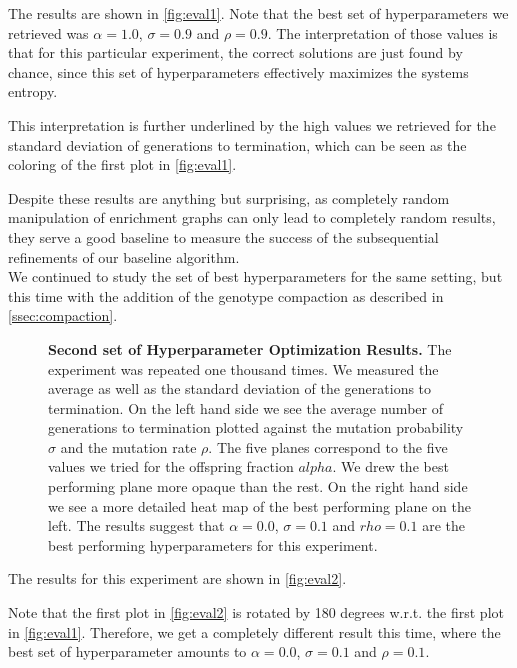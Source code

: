 The results are shown in \autoref{fig:eval1}.
Note that the best set of hyperparameters we retrieved was $\alpha=1.0$, $\sigma=0.9$ and $\rho=0.9$.
The interpretation of those values is that for this particular experiment, the correct solutions are just found by chance, since this set of hyperparameters effectively maximizes the systems entropy.

This interpretation is further underlined by the high values we retrieved for the standard deviation of generations to termination, which can be seen as the coloring of the first plot in \autoref{fig:eval1}.

Despite these results are anything but surprising, as completely random manipulation of enrichment graphs can only lead to completely random results, they serve a good baseline to measure the success of the subsequential refinements of our baseline algorithm.\\

We continued to study the set of best hyperparameters for the same setting, but this time with the addition of the genotype compaction as described in \autoref{ssec:compaction}.

\begin{figure}[!tb]
\centering

\caption[Second set of Hyperparameter Optimization Results]{\textbf{Second set of Hyperparameter Optimization Results.} The experiment was repeated one thousand times. We measured the average as well as the standard deviation of the generations to termination. On the left hand side we see the average number of generations to termination plotted against the mutation probability $\sigma$ and the mutation rate $\rho$. The five planes correspond to the five values we tried for the offspring fraction $alpha$. We drew the best performing plane more opaque than the rest. On the right hand side we see a more detailed heat map of the best performing plane on the left. The results suggest that $\alpha=0.0$, $\sigma=0.1$ and $rho=0.1$ are the best performing hyperparameters for this experiment.}
\label{fig:eval2}  
\end{figure}

The results for this experiment are shown in \autoref{fig:eval2}.

Note that the first plot in \autoref{fig:eval2} is rotated by 180 degrees w.r.t. the first plot in \autoref{fig:eval1}.
Therefore, we get a completely different result this time, where the best set of hyperparameter amounts to $\alpha=0.0$, $\sigma=0.1$ and $\rho=0.1$.\\

